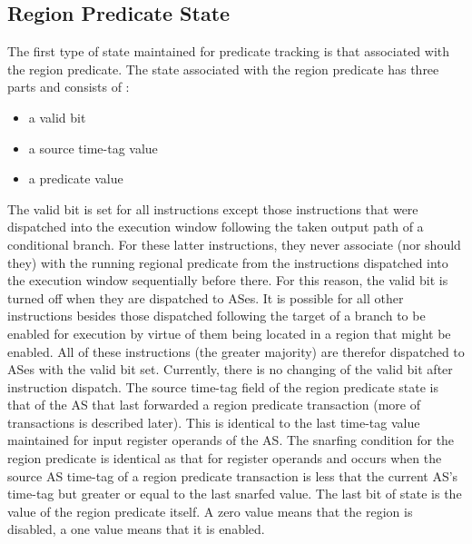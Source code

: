 \documentclass[10pt,dvips]{article}
\begin{document}
\subsection{Region Predicate State}
%
The first type of state maintained for predicate tracking
is that associated with the
region predicate.  The state associated with the region predicate
has three parts and consists of :
%
\begin{itemize}
\item{a valid bit}
\item{a source time-tag value}
\item{a predicate value}
\end{itemize}   
%
The valid bit is set for all instructions except those instructions
that were dispatched into the execution window following the
taken output path of a conditional branch.  For these latter
instructions, they never associate (nor should they) with the
running regional predicate from the instructions dispatched
into the execution window sequentially before there.
For this reason, the valid bit is turned off when they are
dispatched to ASes.  
It is possible for all other instructions besides
those dispatched following the target of a branch to be enabled
for execution by virtue of them being located in a region that 
might be enabled.  All of these instructions (the greater majority)
are therefor dispatched to ASes with the valid bit set.
Currently, there is no changing of the valid bit after instruction
dispatch.  The source time-tag field of the region predicate
state is that of the AS that last forwarded a region predicate
transaction (more of transactions is described later).
This is identical to the last time-tag value maintained
for input register operands of the AS.  The snarfing condition for
the region predicate is identical as that for register operands and occurs
when the source AS time-tag of a region predicate transaction
is less that the current AS's time-tag but greater or equal to the
last snarfed value.
The last bit of state is the value of the region predicate itself.
A zero value means that the region is disabled, a one value means
that it is enabled.
%
\end{document}
